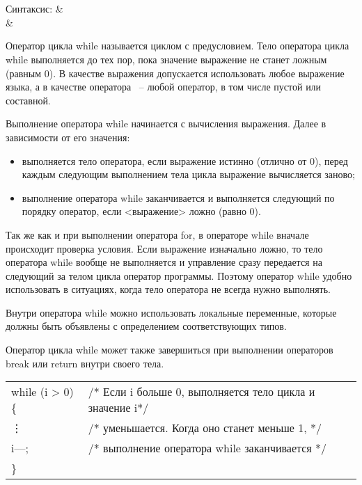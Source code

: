 
\section{}

\begin{pHeader}
Синтаксис:      & \\
                & \\
\end{pHeader}

Оператор цикла while называется циклом с предусловием. Тело оператора цикла while выполняется до тех пор, пока значение выражение не станет ложным (равным 0). В качестве выражения допускается использовать любое выражение языка, а в качестве оператора ~--  любой оператор, в том числе пустой или составной. \killoverfullbefore

Выполнение оператора while начинается с вычисления выражения. Далее в зависимости от его значения:
\begin{itemize}
\item выполняется тело оператора, если выражение истинно (отлично от 0), перед каждым следующим выполнением тела цикла выражение вычисляется заново;
\item выполнение оператора while заканчивается и выполняется следующий по порядку оператор, если <выражение> ложно (равно 0). 
\end{itemize}

Так же как и при выполнении оператора for, в операторе while вначале происходит проверка условия. Если выражение изначально ложно, то тело оператора while вообще не выполняется и управление сразу передается на следующий за телом цикла оператор программы. Поэтому оператор while удобно использовать в ситуациях, когда тело оператора не всегда нужно выполнять. \killoverfullbefore

Внутри оператора while можно использовать локальные переменные, которые должны быть объявлены с определением соответствующих типов. \killoverfullbefore

Оператор цикла while может также завершиться при выполнении операторов break или return внутри своего тела. \killoverfullbefore \BL

\begin{pExample}
\begin{tabular}{ l l }
while (i > 0) \{ & \textcolor{exComm}{/* Если i больше 0, выполняется тело цикла и значение i*/} \\
\indent  \vdots & \textcolor{exComm}{/* уменьшается. Когда оно станет меньше 1, */} \\
\indent i{--}{--}; & \textcolor{exComm}{/* выполнение оператора while заканчивается */} \\
\} & \textcolor{exComm}{ } \\
\end{tabular}
\end{pExample}

